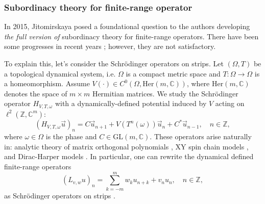 \documentclass[11pt]{amsart}
\theoremstyle{remark}
\theoremstyle{definition}
\begin{document}
\subsubsection{Subordinacy theory for finite-range operator}
In 2015, Jitomirskaya posed a foundational question to the authors developing \textit{the full version of} subordinacy theory for finite-range operators.
There have been some progresses in recent years \cite{MS,OC}; however, they are not satisfactory. 

To explain this, let's consider the Schr\"odinger operators on strips. Let $(\Omega,T)$ be a topological dynamical system, i.e. $\Omega$ is a compact metric space and $T:\Omega\to \Omega$ is a homeomorphism. Assume $V(\cdot) \in C^0(\Omega,\mathrm{Her}(m,\mathbb{C}))$, where $\mathrm{Her}(m,\mathbb{C})$ denotes the space of $m \times m$ Hermitian matrices. We study the 
Schr\"odinger operator $H_{V,T,\omega}$  with a dynamically-defined potential induced by $V$  acting on $\ell^2(\mathbb{Z},\mathbb{C}^m)$:
\begin{equation}\label{strip-operator}
(H_{V,T,\omega}\vec{u})_n = C\vec{u}_{n+1} + V(T^n(\omega))\vec{u}_n + C^*\vec{u}_{n-1}, \quad n \in \mathbb{Z},
\end{equation}
where $\omega \in \Omega$ is the phase and $C \in \mathrm{GL}(m,\mathbb{C})$. These operators arise naturally in:
analytic theory of matrix orthogonal polynomials \cite{DPS}, XY spin chain models \cite{HSS}, and 
Dirac-Harper models \cite{BGW}. In particular, one can rewrite the dynamical defined finite-range operators \begin{equation*}
    (L_{v,w}u)_n = \sum_{k=-m}^{m} w_k u_{n+k} + v_nu_n, \quad n \in \mathbb{Z},
\end{equation*}
as  Schr\"odinger operators on strips \cite{Puig}.
\end{document}
